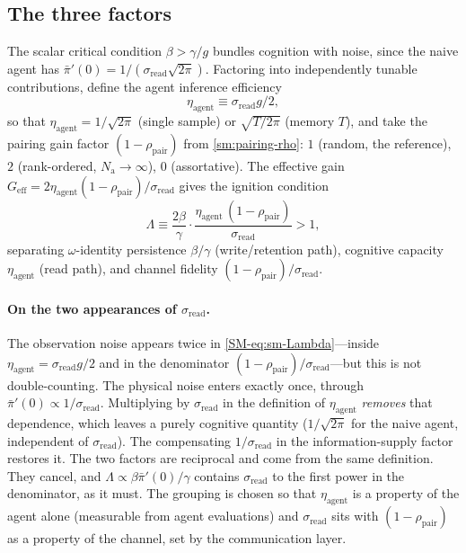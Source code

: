 \documentclass[
  aps,prx,
  preprint,
  superscriptaddress,
  nofootinbib
]{revtex4-2}
\newcommand{\etaag}{\eta_{\mathrm{agent}}}
\newcommand{\rhopair}{\rho_{\mathrm{pair}}}
\newcommand{\sread}{\sigma_{\mathrm{read}}}
\newcommand{\pibar}{\bar\pi}
\newcommand{\gain}{g}
\newcommand{\Nag}{N_{\mathrm{a}}}
\begin{document}
\subsection{The three factors}

\noindent The scalar critical condition $\beta>\gamma/\gain$ bundles cognition with noise, since the naive agent has $\pibar'(0)=1/(\sread\sqrt{2\pi})$. Factoring into independently tunable contributions, define the agent inference efficiency
\begin{equation}
\etaag\equiv\sread\gain/2,
\end{equation}
so that $\etaag=1/\sqrt{2\pi}$ (single sample) or $\sqrt{T/2\pi}$ (memory $T$), and take the pairing gain factor $(1-\rhopair)$ from \cref{sm:pairing-rho}: $1$ (random, the reference), $2$ (rank-ordered, $\Nag\to\infty$), $0$ (assortative). The effective gain $G_{\mathrm{eff}}=2\etaag(1-\rhopair)/\sread$ gives the ignition condition
\begin{equation}\label{SM-eq:sm-Lambda}
\Lambda\equiv\frac{2\beta}{\gamma}\cdot\frac{\etaag\,(1-\rhopair)}{\sread}>1,
\end{equation}
separating $\omega$-identity persistence $\beta/\gamma$ (write/retention path), cognitive capacity $\etaag$ (read path), and channel fidelity $(1-\rhopair)/\sread$.

\paragraph{On the two appearances of $\sread$.} The observation noise appears twice in \cref{SM-eq:sm-Lambda}---inside $\etaag=\sread\gain/2$ and in the denominator $(1-\rhopair)/\sread$---but this is not double-counting. The physical noise enters exactly once, through $\pibar'(0)\propto1/\sread$. Multiplying by $\sread$ in the definition of $\etaag$ \emph{removes} that dependence, which leaves a purely cognitive quantity ($1/\sqrt{2\pi}$ for the naive agent, independent of $\sread$). The compensating $1/\sread$ in the information-supply factor restores it. The two factors are reciprocal and come from the same definition. They cancel, and $\Lambda\propto\beta\pibar'(0)/\gamma$ contains $\sread$ to the first power in the denominator, as it must. The grouping is chosen so that $\etaag$ is a property of the agent alone (measurable from agent evaluations) and $\sread$ sits with $(1-\rhopair)$ as a property of the channel, set by the communication layer.
\end{document}
